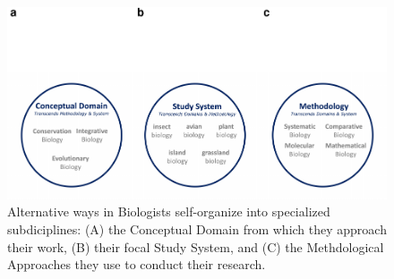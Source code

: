 \documentclass[
  12pt,
  man, donotrepeattitle]{apa6}
\begin{document}
\begin{figure}[H]

{\centering \includegraphics[width=1\linewidth,]{Bruna_plenary_MS_files/figure-latex/fig2-1} 

}

\caption{Alternative ways in Biologists self-organize into specialized subdiciplines: (A) the Conceptual Domain from which they approach their work, (B) their focal Study System, and (C) the Methdological Approaches they use to conduct their research.}\label{fig:fig2}
\end{figure}
\end{document}

